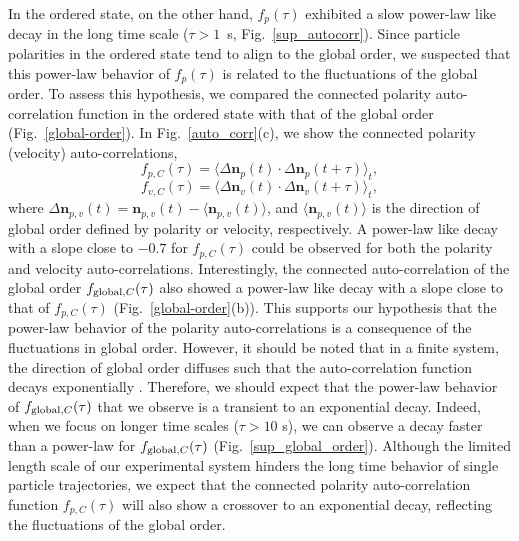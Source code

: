 \documentclass[%
 reprint,
 amsmath,amssymb,
 aps,
 floatfix
]{revtex4-2}
\begin{document}
In the ordered state, on the other hand, $f_p(\tau)$ exhibited a slow power-law like decay in the long time scale ($\tau > 1$~s, Fig.~\ref{sup_autocorr}).
Since particle polarities in the ordered state tend to align to the global order, we suspected that this power-law behavior of $f_p(\tau)$ is related to the fluctuations of the global order.
To assess this hypothesis, we compared the connected polarity auto-correlation function in the ordered state with that of the global order (Fig.~\ref{global-order}).
In Fig.~\ref{auto_corr}(c), we show the connected polarity (velocity) auto-correlations,
\begin{equation}
f_{p,C}(\tau) = \langle\Delta\bm{n}_p(t)\cdot\Delta\bm{n}_p(t+\tau)\rangle_t,
\end{equation}
\begin{equation}
f_{v,C}(\tau) = \langle\Delta\bm{n}_v(t)\cdot\Delta\bm{n}_v(t+\tau)\rangle_t,
\end{equation}
where $\Delta\bm{n}_{p,v}(t) = \bm{n}_{p,v}(t)-\langle\bm{n}_{p,v}(t)\rangle$, and $\langle\bm{n}_{p,v}(t)\rangle$ is the direction of global order defined by polarity or velocity, respectively.
A power-law like decay with a slope close to $-0.7$ for $f_{p,C}(\tau)$ could be observed for both the polarity and velocity auto-correlations.
Interestingly, the connected auto-correlation of the global order 
$f_{{\rm global},C}(\tau)$ \cite{supplement}
also showed a power-law like decay with a slope close to that of $f_{p,C}(\tau)$ (Fig.~\ref{global-order}(b)).
This supports our hypothesis that the power-law behavior of the polarity auto-correlations is a consequence of the fluctuations in global order.
However, it should be noted that in a finite system, the direction of global order diffuses such that the auto-correlation function decays exponentially \cite{benoit2019}. 
Therefore, we should expect that the power-law behavior of $f_{{\rm global},C}(\tau)$ that we observe is a transient to an exponential decay. 
Indeed, when we focus on longer time scales ($\tau>10$ s), we can observe a decay faster than a power-law for $f_{{\rm global},C}(\tau)$ (Fig.~\ref{sup_global_order}).
Although the limited length scale of our experimental system hinders the long time behavior of single particle trajectories, we expect that the connected polarity auto-correlation function $f_{p,C}(\tau)$ will also show a crossover to an exponential decay, reflecting the fluctuations of the global order.
\end{document}
